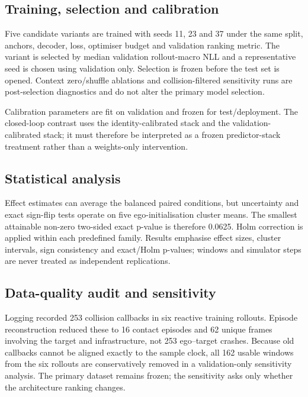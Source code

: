 \subsection{Training, selection and calibration}

Five candidate variants are trained with seeds 11, 23 and 37 under the same
split, anchors, decoder, loss, optimiser budget and validation ranking metric.
The variant is selected by median validation rollout-macro NLL and a
representative seed is chosen using validation only. Selection is frozen before
the test set is opened. Context zero/shuffle ablations and collision-filtered
sensitivity runs are post-selection diagnostics and do not alter the primary
model selection.

Calibration parameters are fit on validation and frozen for test/deployment.
The closed-loop contrast uses the identity-calibrated \Bzero{} stack and the
validation-calibrated \Bone{} stack; it must therefore be interpreted as a
frozen predictor-stack treatment rather than a weights-only intervention.

\subsection{Statistical analysis}

Effect estimates can average the balanced paired conditions, but uncertainty
and exact sign-flip tests operate on five ego-initialisation cluster means.
The smallest attainable non-zero two-sided exact p-value is therefore 0.0625.
Holm correction is applied within each predefined family. Results emphasise
effect sizes, cluster intervals, sign consistency and exact/Holm p-values;
windows and simulator steps are never treated as independent replications.

\subsection{Data-quality audit and sensitivity}

Logging recorded 253 collision callbacks in six reactive training rollouts.
Episode reconstruction reduced these to 16 contact episodes and 62 unique
frames involving the target and infrastructure, not 253 ego--target crashes.
Because old callbacks cannot be aligned exactly to the sample clock, all 162
usable windows from the six rollouts are conservatively removed in a
validation-only sensitivity analysis. The primary dataset remains frozen; the
sensitivity asks only whether the architecture ranking changes.

